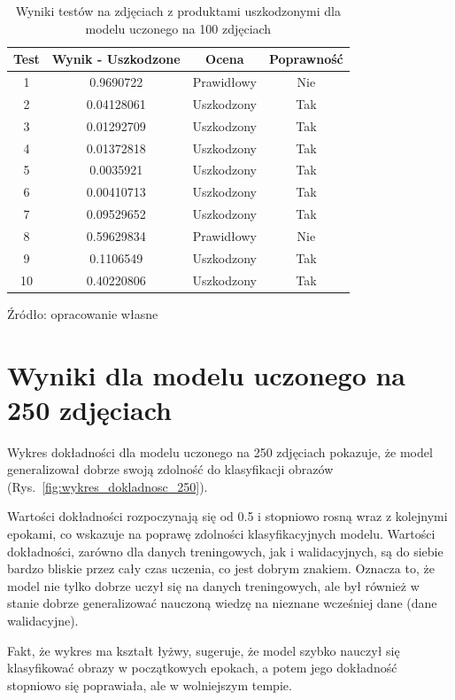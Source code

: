 \begin{table}[H]
\centering
\caption{Wyniki testów na zdjęciach z produktami uszkodzonymi dla modelu uczonego na 100 zdjęciach}
\begin{tabular}{|c|c|c|c|}
\hline
\textbf{Test} & \textbf{Wynik - Uszkodzone} & \textbf{Ocena} & \textbf{Poprawność} \\ \hline
1  & 0.9690722 & Prawidłowy & Nie \\ \hline
2  & 0.04128061 & Uszkodzony & Tak \\ \hline
3  & 0.01292709 & Uszkodzony & Tak \\ \hline
4  & 0.01372818 & Uszkodzony & Tak \\ \hline
5  & 0.0035921 & Uszkodzony & Tak \\ \hline
6  & 0.00410713 & Uszkodzony & Tak \\ \hline
7  & 0.09529652 & Uszkodzony & Tak \\ \hline
8  & 0.59629834 & Prawidłowy & Nie \\ \hline
9  & 0.1106549 & Uszkodzony & Tak \\ \hline
10  & 0.40220806 & Uszkodzony & Tak \\ \hline
\end{tabular}
\begin{center}
\footnotesize{Źródło: opracowanie własne}
\end{center}
\label{tab:test_results_uszkodzone_100}
\end{table}

\section{Wyniki dla modelu uczonego na 250 zdjęciach}

Wykres dokładności dla modelu uczonego na 250 zdjęciach pokazuje, że model generalizował dobrze swoją zdolność do klasyfikacji obrazów (Rys.~\ref{fig:wykres_dokladnosc_250}).

Wartości dokładności rozpoczynają się od 0.5 i stopniowo rosną wraz z kolejnymi epokami, co wskazuje na poprawę zdolności klasyfikacyjnych modelu. Wartości dokładności, zarówno dla danych treningowych, jak i walidacyjnych, są do siebie bardzo bliskie przez cały czas uczenia, co jest dobrym znakiem. Oznacza to, że model nie tylko dobrze uczył się na danych treningowych, ale był również w stanie dobrze generalizować nauczoną wiedzę na nieznane wcześniej dane (dane walidacyjne).

Fakt, że wykres ma kształt łyżwy, sugeruje, że model szybko nauczył się klasyfikować obrazy w początkowych epokach, a potem jego dokładność stopniowo się poprawiała, ale w wolniejszym tempie.

